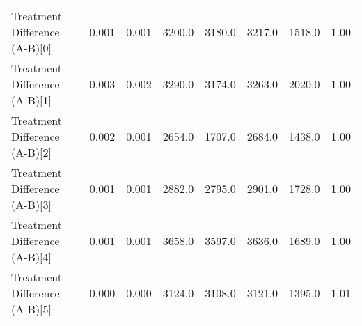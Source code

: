 \begin{tabular}{lrrrrrrr}
Treatment Difference (A-B)[0]         &      0.001 &    0.001 &    3200.0 &  3180.0 &    3217.0 &    1518.0 &   1.00 \\
Treatment Difference (A-B)[1]         &      0.003 &    0.002 &    3290.0 &  3174.0 &    3263.0 &    2020.0 &   1.00 \\
Treatment Difference (A-B)[2]         &      0.002 &    0.001 &    2654.0 &  1707.0 &    2684.0 &    1438.0 &   1.00 \\
Treatment Difference (A-B)[3]         &      0.001 &    0.001 &    2882.0 &  2795.0 &    2901.0 &    1728.0 &   1.00 \\
Treatment Difference (A-B)[4]         &      0.001 &    0.001 &    3658.0 &  3597.0 &    3636.0 &    1689.0 &   1.00 \\
Treatment Difference (A-B)[5]         &      0.000 &    0.000 &    3124.0 &  3108.0 &    3121.0 &    1395.0 &   1.01 \\
\bottomrule
\end{tabular}

